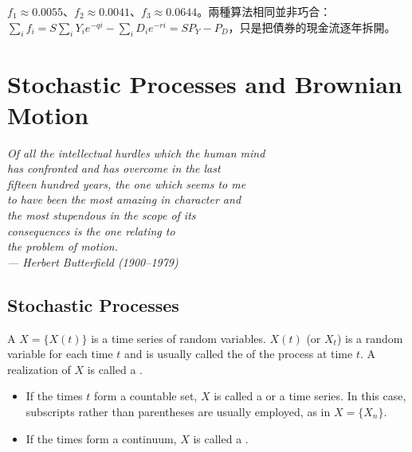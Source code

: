 \suppstart
{}

\begin{remark}
	$f_{1}\approx0.0055$、$f_{2}\approx0.0041$、$f_{3}\approx0.0644$。兩種算法相同並非巧合：$\sum_{i}f_{i}=S\sum_{i}Y_{i}e^{-qi}-\sum_{i}D_{i}e^{-ri}=SP_{Y}-P_{D}$，只是把債券的現金流逐年拆開。
\end{remark}
\suppend

\chapter{Stochastic Processes and Brownian Motion}
\label{ch:stochastic}


\begin{flushright}
	\itshape Of all the intellectual hurdles which the human mind\\
	has confronted and has overcome in the last\\
	fifteen hundred years, the one which seems to me\\
	to have been the most amazing in character and\\
	the most stupendous in the scope of its\\
	consequences is the one relating to\\
	the problem of motion.\\
	\upshape --- Herbert Butterfield (1900--1979)
\end{flushright}

\section{Stochastic Processes}
\label{sec:stochastic-processes}


\begin{definition}
	A  $X=\{X(t)\}$ is a time series of random variables.
	$X(t)$ (or $X_{t}$) is a random variable for each time $t$ and is usually called the  of the process at time $t$.
	A realization of $X$ is called a .
	\begin{itemize}[nosep]
		\item If the times $t$ form a countable set, $X$ is called a  or a time series. In this case, subscripts rather than parentheses are usually employed, as in $X=\{X_{n}\}$.
		\item If the times form a continuum, $X$ is called a .
	\end{itemize}
\end{definition}

